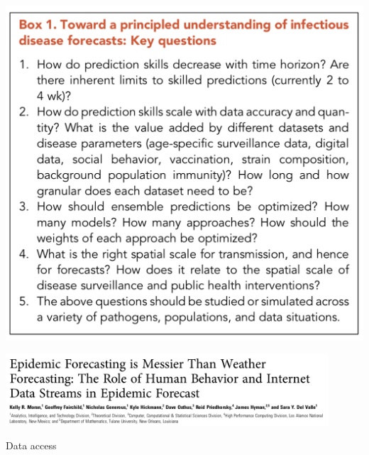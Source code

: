 \documentclass[aspectratio=169]{beamer}
\begin{document}
\begin{frame}

\begin{center}
\includegraphics[height = 0.9\textheight]{figures/viboud_future_2019_box1}
\end{center}

\end{frame}
\begin{frame}

\begin{center}
\includegraphics[width = 0.9\textwidth]{figures/moran_epidemic_2016_title}
\end{center}

\end{frame}
\begin{frame}

\begin{center}
Data access
\end{center}

\end{frame}
\end{document}
